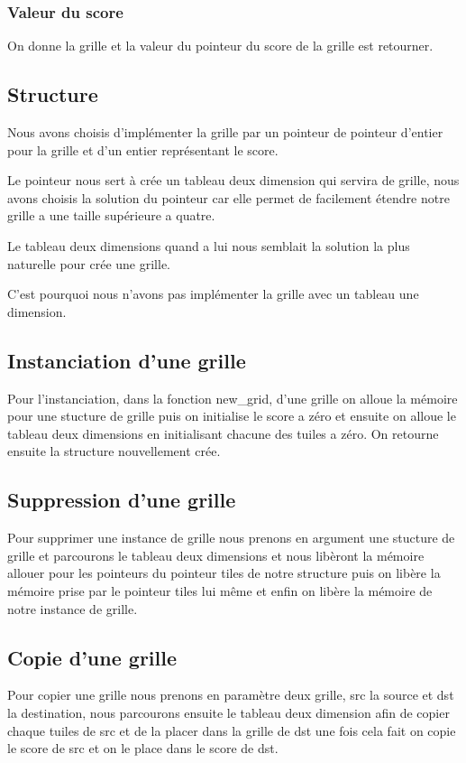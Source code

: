 \documentclass{article}
\begin{document}
\subsubsection{Valeur du score}
On donne la grille et la valeur du pointeur du score de la grille est retourner.
\subsection{Structure}

Nous avons choisis d'implémenter la grille par un pointeur de pointeur d'entier pour la grille et d'un entier représentant le score.

Le pointeur nous sert à crée un tableau deux dimension qui servira de grille, nous avons choisis la solution du pointeur car elle permet de facilement étendre notre grille a une taille supérieure a quatre.

Le tableau deux dimensions quand a lui nous semblait la solution la plus naturelle pour crée une grille.

C'est pourquoi nous n'avons pas implémenter la grille avec un tableau une dimension.


\subsection{Instanciation d'une grille}
Pour l'instanciation, dans la fonction new\_grid, d'une grille on alloue la mémoire pour une stucture de grille puis on initialise le score a zéro et ensuite on alloue le tableau deux dimensions en initialisant chacune des tuiles a zéro. On retourne ensuite la structure nouvellement crée.
\subsection{Suppression d'une grille}
Pour supprimer une instance de grille nous prenons en argument une stucture de grille et parcourons le tableau deux dimensions et nous libèront la mémoire allouer pour les pointeurs du pointeur tiles de notre structure puis on libère la mémoire prise par le pointeur tiles lui même et enfin on libère la mémoire de notre instance de grille.
\subsection{Copie d'une grille}
Pour copier une grille nous prenons en paramètre deux grille, src la source et dst la destination, nous parcourons ensuite le tableau deux dimension afin de copier chaque tuiles de src et de la placer dans la grille de dst une fois cela fait on copie le score de src et on le place dans le score de dst.
\end{document}
